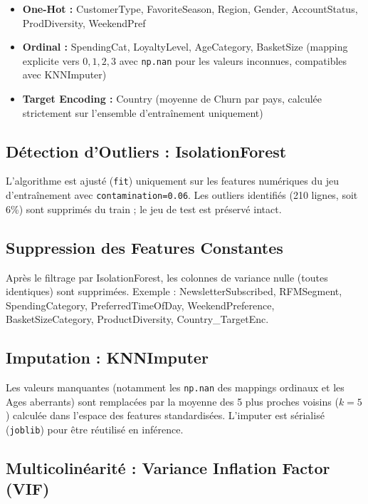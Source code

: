 \documentclass[11pt,a4paper]{article}
\begin{document}
\begin{itemize}
    \item \textbf{One-Hot :} CustomerType, FavoriteSeason, Region, Gender, AccountStatus, ProdDiversity, WeekendPref
    \item \textbf{Ordinal :} SpendingCat, LoyaltyLevel, AgeCategory, BasketSize (mapping explicite vers $0,1,2,3$ avec \texttt{np.nan} pour les valeurs inconnues, compatibles avec KNNImputer)
    \item \textbf{Target Encoding :} Country (moyenne de Churn par pays, calculée strictement sur l'ensemble d'entraînement uniquement)
\end{itemize}

\subsection{Détection d'Outliers : IsolationForest}

L'algorithme est ajusté (\texttt{fit}) uniquement sur les features numériques du jeu d'entraînement avec \texttt{contamination=0.06}. Les outliers identifiés (210 lignes, soit 6\%) sont supprimés du train ; le jeu de test est préservé intact.

\subsection{Suppression des Features Constantes}

Après le filtrage par IsolationForest, les colonnes de variance nulle (toutes identiques) sont supprimées. Exemple : NewsletterSubscribed, RFMSegment, SpendingCategory, PreferredTimeOfDay, WeekendPreference, BasketSizeCategory, ProductDiversity, Country\_TargetEnc.

\subsection{Imputation : KNNImputer}

Les valeurs manquantes (notamment les \texttt{np.nan} des mappings ordinaux et les Ages aberrants) sont remplacées par la moyenne des 5 plus proches voisins ($k=5$) calculée dans l'espace des features standardisées. L'imputer est sérialisé (\texttt{joblib}) pour être réutilisé en inférence.

\subsection{Multicolinéarité : Variance Inflation Factor (VIF)}
\end{document}
